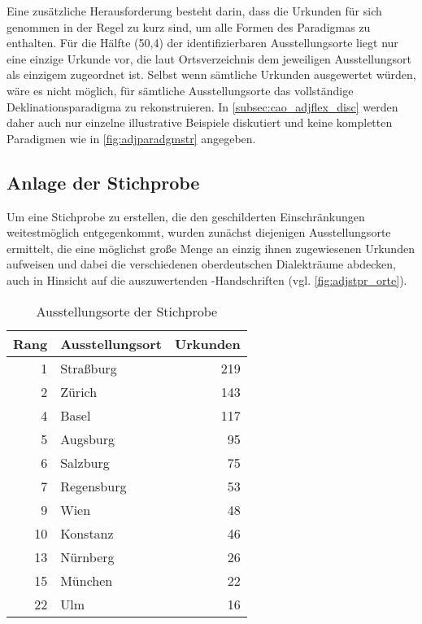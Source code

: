 Eine zusätzliche Herausforderung besteht darin, dass die Urkunden für sich
genommen in der Regel zu kurz sind, um alle Formen des Paradigmas zu enthalten.
Für die Hälfte (50,4\pct) der identifizierbaren Ausstellungs\-orte liegt nur
eine einzige Urkunde vor, die laut Ortsverzeichnis dem jeweiligen
Ausstellungs\-ort als einzigem zugeordnet ist. Selbst wenn sämtliche Urkunden
ausgewertet würden, wäre es nicht möglich, für sämtliche Ausstellungs\-orte das
vollständige Deklinationsparadigma zu rekonstruieren. In
\cref{subsec:cao_adjflex_disc} werden daher auch nur einzelne illustrative
Beispiele diskutiert und keine kompletten Paradigmen wie in
\cref{fig:adjparadgmstr} angegeben.

\subsection{Anlage der Stichprobe}
\label{subsec:cao_sample}

Um eine Stichprobe zu erstellen, die den geschilderten Einschränkungen
weitestmöglich entgegenkommt, wurden zunächst diejenigen Ausstellungs\-orte
ermittelt, die eine möglichst große Menge an einzig ihnen zugewiesenen Urkunden
aufweisen und dabei die verschiedenen oberdeutschen Dialekt\-räume abdecken,
auch in Hinsicht auf die auszuwertenden \KC{}-Handschriften (vgl.
\cref{fig:adjstpr_orte}).

\begin{table}
\centering
\caption{Ausstellungs\-orte der Stichprobe}
\begin{tabular}{r l r}
\toprule
Rang
	& Ausstellungs\-ort
	& Urkunden
	\\

\midrule

 1 & Straßburg  & 219 \\
 2 & Zürich     & 143 \\
 4 & Basel      & 117 \\
 5 & Augsburg   &  95 \\
 6 & Salzburg   &  75 \\
 7 & Regensburg &  53 \\
 9 & Wien       &  48 \\
10 & Konstanz	&  46 \\

\midrule

13 & Nürnberg   &  26 \\
15 & München    &  22 \\
22 & Ulm        &  16 \\

\bottomrule
\end{tabular}
\label{tab:adjstpr_orte}
\end{table}

